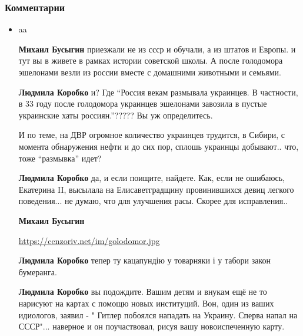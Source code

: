  
 
 
 
 
\clearpage
\subsubsection{Комментарии}
\label{sec:18_06_2020.fb.zharkih_ekaterina.1.mova_jazyk.cmt}

\begin{itemize}
\item aa

\begin{itemize}

\textbf{Михаил Бусыгин} приезжали не из ссср и обучали, а из штатов и Европы. и тут вы в
живете в рамках истории советской школы. А после голодомора эшелонами везли из
россии вместе с домашними животными и семьями.

\textbf{Людмила Коробко} 
и? Где \enquote{Россия векам размывала украинцев. В частности, в 33 году после
голодомора украинцев эшелонами завозила в пустые украинские хаты россиян.}?????
Вы уж определитесь.

И по теме, на ДВР огромное количество украинцев трудится, в Сибири, с момента
обнаружения нефти и до сих пор, сплошь украинцы добывают.. что, тоже
\enquote{размывка} идет?


\textbf{Людмила Коробко} да, и если поищите, найдете. Как, если не ошибаюсь,
Екатерина II, высылала на Елисаветградщину провинившихся девиц легкого
поведения... не думаю, что для улучшения расы. Скорее для исправления..

\textbf{Михаил Бусыгин} 

\url{https://cenzoriv.net/im/golodomor.jpg}

\textbf{Людмила Коробко} тепер ту кацапундію у товарняки і у табори закон
бумеранга.

\textbf{Людмила Коробко} вы подождите. Вашим детям и внукам ещё не то нарисуют
на картах с помощю новых институций. Вон, один из ваших идиологов, заявил - "
Гитлер побоялся нападать на Украину. Сперва напал на СССР"... наверное и он
поучаствовал, рисуя вашу новоиспеченную карту.


\end{itemize}
\end{itemize}
